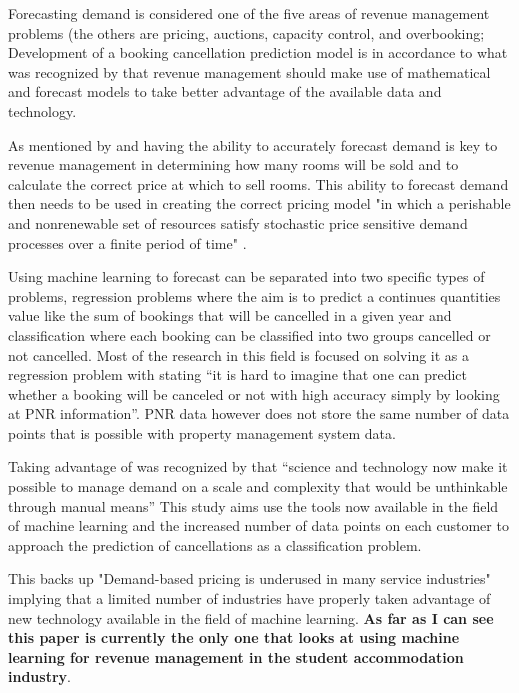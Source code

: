  Forecasting demand is considered one of the five areas of revenue management problems (the others are pricing, auctions, capacity control, and overbooking; \cite{Chiang2007AnResearch}  Development of a booking cancellation prediction model is in accordance to what was recognized by \cite{Chiang2007AnResearch} that revenue management should make use of mathematical and forecast models to take better advantage of the available data and technology.
 
\vspace{5mm}

As mentioned by \cite{RevenueWorldCat.org} and \cite{Weatherford2003AManagement} having the ability to accurately forecast demand is key to revenue management in determining how many rooms will be sold and to calculate the correct price at which to sell rooms. This ability to forecast demand then needs to be used in creating the correct pricing model "in which a perishable and nonrenewable set of resources satisfy stochastic price sensitive demand processes over a finite period of time" \cite{Bitran2003AnManagement}.

\vspace{5mm}

Using machine learning to forecast can be separated into two specific types of problems, regression problems where the aim is to predict a continues quantities value like the sum of bookings that will be cancelled in a given year and classification where each booking can be classified into two groups cancelled or not cancelled. Most of the research in this field is focused on solving it as a regression problem with  \cite{RomeroMorales2010ForecastingMining} stating “it is hard to imagine that one can predict whether a booking will be canceled or not with high accuracy simply by looking at PNR information”. PNR data however does not store the same number of data points that is possible with property management system data.

\vspace{5mm}

Taking advantage of was recognized by \cite{Talluri2004TheManagement} that “science and technology now make it possible to manage demand on a scale and complexity that would be unthinkable through manual means”  This study aims use the tools now available in the field of machine learning and the increased number of data points on each customer to approach the prediction of cancellations as a classification problem.   

This backs up "Demand-based pricing is underused in many service industries" \cite{Kimes2003HasAcceptable} implying that a limited number of industries have properly taken advantage of new technology available in the field of machine learning. \textbf{As far as I can see this paper is currently the only one that looks at using machine learning for revenue management in the student accommodation industry}. 

